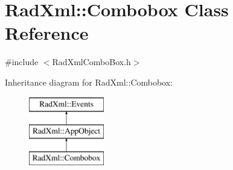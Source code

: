 \hypertarget{class_rad_xml_1_1_combobox}{\section{Rad\-Xml\-:\-:Combobox Class Reference}
\label{class_rad_xml_1_1_combobox}
}


{\ttfamily \#include $<$Rad\-Xml\-Combo\-Box.\-h$>$}

Inheritance diagram for Rad\-Xml\-:\-:Combobox\-:\begin{figure}[H]
\begin{center}
\leavevmode
\includegraphics[height=3.000000cm]{class_rad_xml_1_1_combobox}
\end{center}
\end{figure}
